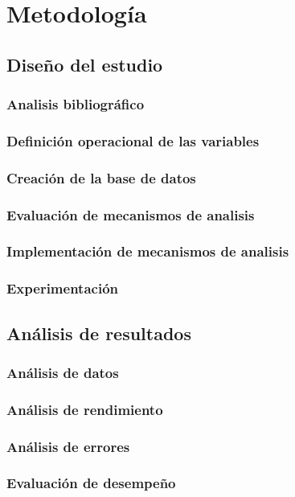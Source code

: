 
\chapter{Metodología} %

\label{Chapter3} %


\section{Diseño del estudio}

\subsection{Analisis bibliográfico}

\subsection{Definición operacional de las variables}

\subsection{Creación de la base de datos}

\subsection{Evaluación de mecanismos de analisis}

\subsection{Implementación de mecanismos de analisis}

\subsection{Experimentación}

\section{Análisis de resultados}

\subsection{Análisis de datos}

\subsection{Análisis de rendimiento}

\subsection{Análisis de errores}

\subsection{Evaluación de desempeño}


